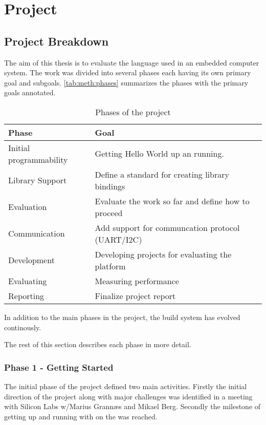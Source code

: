 \section{Project}

\subsection{Project Breakdown}

The aim of this thesis is to evaluate the \rust language used in an embedded computer system.
The work was divided into several phases each having its own primary goal and subgoals.
\autoref{tab:meth:phases} summarizes the phases with the primary goals annotated.

\begin{table}[H]
  \begin{center}
    \begin{tabular}{|l|l|}
      \hline
      Phase&Goal \\
      \hline
      \hline
      Initial programmability&Getting Hello World up an running.\\
      \hline
      Library Support&Define a standard for creating library bindings\\
      \hline
      Evaluation&Evaluate the work so far and define how to proceed\\
      \hline
      Communication&Add support for communcation protocol (UART/I2C)\\
      \hline
      Development&Developing projects for evaluating the platform\\
      \hline
      Evaluating&Measuring performance\\
      \hline
      Reporting&Finalize project report\\
      \hline
    \end{tabular}
  \end{center}
  \caption{Phases of the project}
  \label{tab:meth:phases}
\end{table}

In addition to the main phases in the project, the build system has evolved continously.

The rest of this section describes each phase in more detail.

\subsubsection{Phase 1 - Getting Started}
The initial phase of the project defined two main activities.
Firstly the initial direction of the project along with major challenges was identified in a meeting with Silicon Labs w/Marius Grannæs and Mikael Berg.
Secondly the milestone of getting up and running with \rust on the \gecko was reached.

